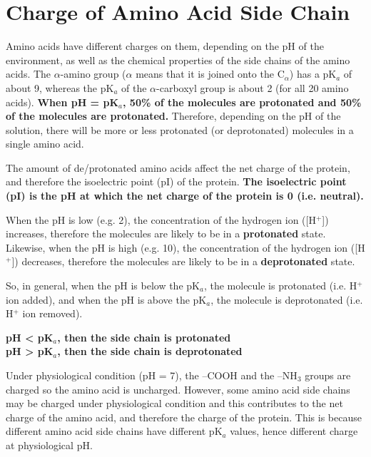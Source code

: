 \section{Charge of Amino Acid Side Chain}

Amino acids have different charges on them, depending on the pH of the environment, as well as the chemical properties of the side chains of the amino acids.
The $\alpha$-amino group ($\alpha$ means that it is joined onto the C$_{\alpha}$) has a pK$_a$ of about 9, whereas the pK$_a$ of the $\alpha$-carboxyl group is about 2 (for all 20 amino acids).
\textbf{When pH = pK$_a$, 50\% of the molecules are protonated and 50\% of the molecules are protonated.}
Therefore, depending on the pH of the solution, there will be more or less protonated (or deprotonated) molecules in a single amino acid.

The amount of de/protonated amino acids affect the net charge of the protein, and therefore the isoelectric point (pI) of the protein.
\textbf{The isoelectric point (pI) is the pH at which the net charge of the protein is 0 (i.e. neutral).}

When the pH is low (e.g. 2), the concentration of the hydrogen ion ([H$^+$]) increases, therefore the molecules are likely to be in a \textbf{protonated} state.
Likewise, when the pH is high (e.g. 10), the concentration of the hydrogen ion ([H$^+$]) decreases, therefore the molecules are likely to be in a \textbf{deprotonated} state.

So, in general, when the pH is below the pK$_a$, the molecule is protonated (i.e. H$^+$ ion added), and when the pH is above the pK$_a$, the molecule is deprotonated (i.e. H$^+$ ion removed).

\begin{center}
    \textbf
        {pH \textless{} pK$_a$, then the side chain is protonated \\
        pH \textgreater{} pK$_a$, then the side chain is deprotonated}
\end{center}

Under physiological condition (pH = 7), the --COOH and the --NH$_3$ groups are charged so the amino acid is uncharged.
However, some amino acid side chains may be charged under physiological condition and this contributes to the net charge of the amino acid, and therefore the charge of the  protein.
This is because different amino acid side chains have different pK$_a$ values, hence different charge at physiological pH.

\begin{center}
\end{center}


